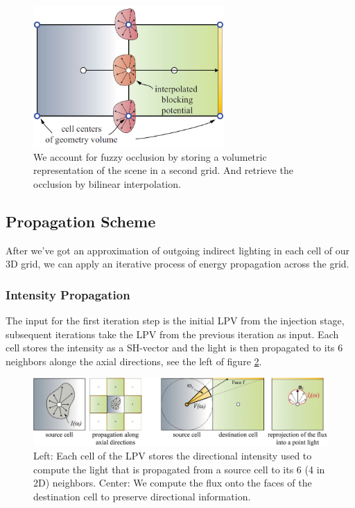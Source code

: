 \begin{figure}
\sidecaption
	\includegraphics[width=0.65\textwidth]{graphics/lpv/lpv-5-2}
	\caption{We account for fuzzy occlusion by storing a volumetric representation of the scene in a second grid. And retrieve the occlusion by bilinear interpolation.}
	\label{f:lpv-interpolation}
\end{figure}




\subsection{Propagation Scheme}
After we've got an approximation of outgoing indirect lighting in each cell of our 3D grid, we can apply an iterative process of energy propagation across the grid.



\subsubsection{Intensity Propagation}
The input for the first iteration step is the initial LPV from the injection stage, subsequent iterations take the LPV from the previous iteration as input. Each cell stores the intensity as a SH-vector and the light is then propagated to its 6 neighbors alonge the axial directions, see the left of figure \ref{f:lpv-propagation}.

\begin{figure}\label{f:lpv-propagation}
	\includegraphics[width=1.0\textwidth]{graphics/lpv/lpv-6-2}
	\caption{Left: Each cell of the LPV stores the directional intensity used to compute the light that is propagated from a source cell to its 6 (4 in 2D) neighbors. Center: We compute the flux onto the faces of the destination cell to preserve directional information.}
\end{figure}

